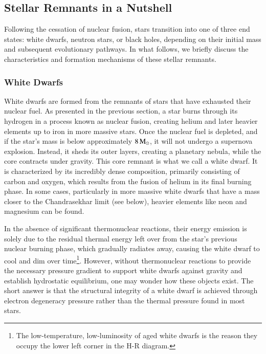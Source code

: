\documentclass[main.tex]{subfiles}
\begin{document}
    

    \subsection{Stellar Remnants in a Nutshell}\label{sec:ch1:remnants}
    Following the cessation of nuclear fusion, stars transition into one of three end states: white dwarfs, neutron stars, or black holes, depending on their initial mass and subsequent evolutionary pathways. In what follows, we briefly discuss the characteristics and formation mechanisms of these stellar remnants.
    
    \subsubsection{White Dwarfs}
    White dwarfs are formed from the remnants of stars that have exhausted their nuclear fuel. As presented in the previous section, a star burns through its hydrogen in a process known as nuclear fusion, creating helium and later heavier elements up to iron in more massive stars. Once the nuclear fuel is depleted, and if the star's mass is below approximately $8\mathrm{\,M_\odot}$, it will not undergo a supernova explosion. Instead, it sheds its outer layers, creating a planetary nebula, while the core contracts under gravity. This core remnant is what we call a white dwarf. It is characterized by its incredibly dense composition, primarily consisting of carbon and oxygen, which results from the fusion of helium in its final burning phase.  In some cases, particularly in more massive white dwarfs that have a mass closer to the Chandrasekhar limit (see below), heavier elements like neon and magnesium can be found.

    In the absence of significant thermonuclear reactions, their energy emission is solely due to the residual thermal energy left over from the star's previous nuclear burning phase, which gradually radiates away, causing the white dwarf to cool and dim over time\footnote{The low-temperature, low-luminosity of aged white dwarfs is the reason they occupy the lower left corner in the H-R diagram.}. However, without thermonuclear reactions to provide the necessary pressure gradient to support white dwarfs against gravity and establish hydrostatic equilibrium, one may wonder how these objects exist. The short answer is that the structural integrity of a white dwarf is achieved through electron degeneracy pressure rather than the thermal pressure found in most stars. 
\end{document}
